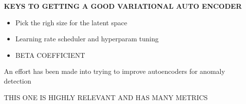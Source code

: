 \textbf{KEYS TO GETTING A GOOD VARIATIONAL AUTO ENCODER}

\begin{itemize}
    \item Pick the righ size for the latent space
    \item Learning rate scheduler  and hyperparam tuning 
    \item BETA COEFFICIENT
\end{itemize}

An effort has been made into trying to improve autoencoders for anomaly detection \cite{tan2023improving}

THIS ONE IS HIGHLY RELEVANT AND HAS MANY METRICS \cite{s23021009}